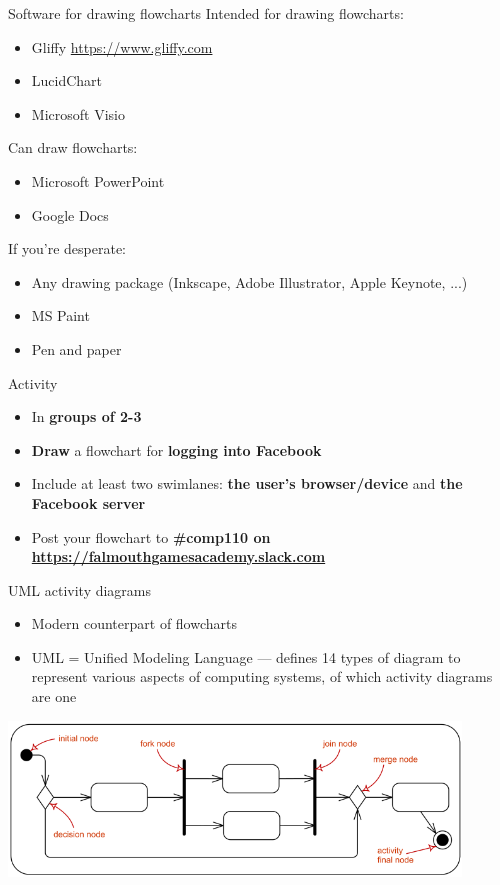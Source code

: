 \begin{frame}{Software for drawing flowcharts}
	\pause Intended for drawing flowcharts:
	\begin{itemize}
		\item Gliffy \url{https://www.gliffy.com}
		\item LucidChart
		\item Microsoft Visio
	\end{itemize}
	\pause Can draw flowcharts:
	\begin{itemize}
		\item Microsoft PowerPoint
		\item Google Docs
	\end{itemize}
	\pause If you're desperate:
	\begin{itemize}
		\item Any drawing package (Inkscape, Adobe Illustrator, Apple Keynote, ...)
		\item MS Paint
		\item Pen and paper
	\end{itemize}
\end{frame}

\begin{frame}{Activity}
	\begin{itemize}
		\item In \textbf{groups of 2-3}
		\item \textbf{Draw} a flowchart for \textbf{logging into Facebook}
		\item Include at least two swimlanes: \textbf{the user's browser/device} and \textbf{the Facebook server}
		\item Post your flowchart to \textbf{\#comp110 on \url{https://falmouthgamesacademy.slack.com}}
	\end{itemize}
\end{frame}

\begin{frame}{UML activity diagrams}
	\begin{itemize}
		\pause\item Modern counterpart of flowcharts
		\pause\item UML = Unified Modeling Language --- defines 14 types of diagram to represent various aspects of computing systems, of which activity diagrams are one
	\end{itemize}
	\pause
	\begin{center}
		\includegraphics[width=0.9\textwidth]{uml_symbols}
	\end{center}
\end{frame}

